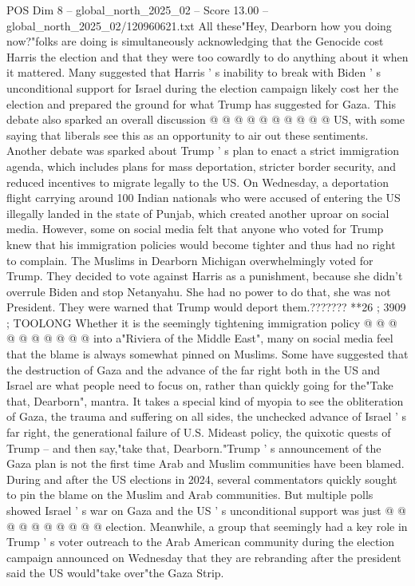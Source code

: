 \begin{textsample}{POS Dim 8 – global\_north\_2025\_02 – Score 13.00 – global\_north\_2025\_02/120960621.txt}
All these"Hey, Dearborn how you doing now?"folks are doing is simultaneously acknowledging that the Genocide cost Harris the election and that they were too cowardly to do anything about it when it mattered.
Many suggested that Harris ' s inability to break with Biden ' s unconditional support for Israel during the election campaign likely cost her the election and prepared the ground for what Trump has suggested for Gaza.
This debate also sparked an overall discussion @ @ @ @ @ @ @ @ @ @ US, with some saying that liberals see this as an opportunity to air out these sentiments.
Another debate was sparked about Trump ' s plan to enact a strict immigration agenda, which includes plans for mass deportation, stricter border security, and reduced incentives to migrate legally to the US.
On Wednesday, a deportation flight carrying around 100 Indian nationals who were accused of entering the US illegally landed in the state of Punjab, which created another uproar on social media.
However, some on social media felt that anyone who voted for Trump knew that his immigration policies would become tighter and thus had no right to complain.
The Muslims in Dearborn Michigan overwhelmingly voted for Trump.
They decided to vote against Harris as a punishment, because she didn't overrule Biden and stop Netanyahu.
She had no power to do that, she was not President.
They were warned that Trump would deport them.??????? **26 ; 3909 ; TOOLONG Whether it is the seemingly tightening immigration policy @ @ @ @ @ @ @ @ @ @ into a"Riviera of the Middle East", many on social media feel that the blame is always somewhat pinned on Muslims.
Some have suggested that the destruction of Gaza and the advance of the far right both in the US and Israel are what people need to focus on, rather than quickly going for the"Take that, Dearborn", mantra.
It takes a special kind of myopia to see the obliteration of Gaza, the trauma and suffering on all sides, the unchecked advance of Israel ' s far right, the generational failure of U.S.
Mideast policy, the quixotic quests of Trump -- and then say,"take that, Dearborn."Trump ' s announcement of the Gaza plan is not the first time Arab and Muslim communities have been blamed.
During and after the US elections in 2024, several commentators quickly sought to pin the blame on the Muslim and Arab communities.
But multiple polls showed Israel ' s war on Gaza and the US ' s unconditional support was just @ @ @ @ @ @ @ @ @ @ election.
Meanwhile, a group that seemingly had a key role in Trump ' s voter outreach to the Arab American community during the election campaign announced on Wednesday that they are rebranding after the president said the US would"take over"the Gaza Strip.

\end{textsample}

